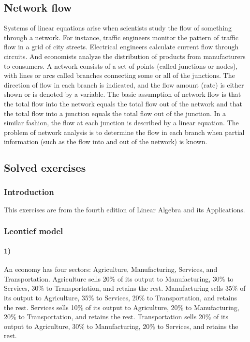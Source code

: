 \documentclass[oneside]{book}
\begin{document}
\subsection{Network flow}
Systems of linear equations arise when scientists study the flow of something
through a network.
For instance, traffic engineers monitor the pattern of traffic flow in a grid of
city streets.
Electrical engineers calculate current flow through circuits.
And economists analyze the distribution of products from manufacturers to
consumers.
A network consists of a set of points (called junctions or nodes),
with lines or arcs called branches connecting some or all of the junctions.
The direction of flow in each branch is indicated,
and the flow amount (rate) is either shown or is denoted by a variable.
The basic assumption of network flow is that the total flow into the network
equals
the total flow out of the network and that the total flow into a junction equals
the total
flow out of the junction.
In a similar fashion, the flow at each junction is described by a linear
equation. The
problem of network analysis is to determine the flow in each branch when partial
information (such as the flow into and out of the network) is known.

\subsection{Solved exercises}
\subsubsection{Introduction}
This exercises are from the fourth edition of Linear Algebra and its
Applications.
\subsubsection{Leontief model}
\paragraph{1)}
An economy has four sectors: Agriculture, Manufacturing, Services, and
Transportation.
Agriculture sells 20\% of its output to Manufacturing, 30\% to Services, 30\% to
Transportation, and retains the rest.
Manufacturing sells 35\% of its output to Agriculture, 35\% to Services, 20\% to
Transportation, and retains the rest.
Services sells 10\% of its output to Agriculture, 20\% to Manufacturing, 20\% to
Transportation, and retains the rest.
Transportation sells 20\% of its output to Agriculture, 30\% to Manufacturing,
20\% to Services, and retains the rest.
\end{document}
